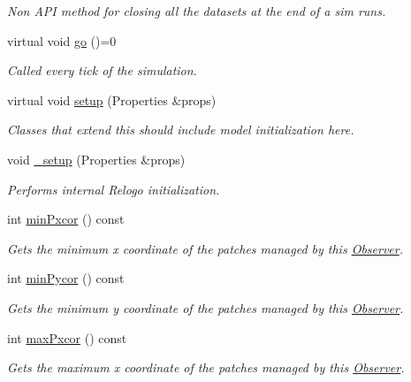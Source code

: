 \begin{DoxyCompactItemize}
\begin{DoxyCompactList}\small\item\em Non A\-P\-I method for closing all the datasets at the end of a sim runs. \end{DoxyCompactList}\item 
virtual void \hyperlink{classrepast_1_1relogo_1_1_observer_a4ab373d9fd531a50e788c5a6bac04002}{go} ()=0
\begin{DoxyCompactList}\small\item\em Called every tick of the simulation. \end{DoxyCompactList}\item 
virtual void \hyperlink{classrepast_1_1relogo_1_1_observer_a2780109d873c73115d44cddf8f138ef3}{setup} (Properties \&props)
\begin{DoxyCompactList}\small\item\em Classes that extend this should include model initialization here. \end{DoxyCompactList}\item 
void \hyperlink{classrepast_1_1relogo_1_1_observer_aa84ed23a631c997aaf5942eb22becfa5}{\-\_\-setup} (Properties \&props)
\begin{DoxyCompactList}\small\item\em Performs internal Relogo initialization. \end{DoxyCompactList}\item 
int \hyperlink{classrepast_1_1relogo_1_1_observer_a4b6cf502f73063c0d99af21e7a3eab50}{min\-Pxcor} () const 
\begin{DoxyCompactList}\small\item\em Gets the minimum x coordinate of the patches managed by this \hyperlink{classrepast_1_1relogo_1_1_observer}{Observer}. \end{DoxyCompactList}\item 
int \hyperlink{classrepast_1_1relogo_1_1_observer_a8b4a2f3c5b662a20caf690baa389be05}{min\-Pycor} () const 
\begin{DoxyCompactList}\small\item\em Gets the minimum y coordinate of the patches managed by this \hyperlink{classrepast_1_1relogo_1_1_observer}{Observer}. \end{DoxyCompactList}\item 
int \hyperlink{classrepast_1_1relogo_1_1_observer_a02da6b9980c4a06926e024234c708f85}{max\-Pxcor} () const 
\begin{DoxyCompactList}\small\item\em Gets the maximum x coordinate of the patches managed by this \hyperlink{classrepast_1_1relogo_1_1_observer}{Observer}. \end{DoxyCompactList}\item 

\end{DoxyCompactItemize}
